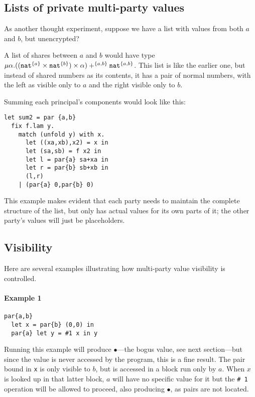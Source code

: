 \documentclass[10pt]{article}
\newcommand{\tnat}{\ensuremath{\mathtt{nat}}}
\newcommand{\tpair}[2]{\ensuremath{{#1} \times {#2}}}
\newcommand{\tsum}[3]{\ensuremath{{#1} +^{#3} {#2}}}
\newcommand{\trec}[2]{\ensuremath{\mu {#1}.{#2}}}
\newcommand{\vcrash}{\ensuremath{\bullet}}
\begin{document}
\subsection{Lists of private multi-party values}

As another thought experiment, suppose we have a list with values from
both $a$ and $b$, but unencrypted?

A list of shares between $a$ and $b$ would have type
$\trec{\alpha}{\tsum{(\tpair{(\tpair{\tnat^{\{a\}}}{\tnat^{\{b\}}})}{\alpha})}{\tnat^{\twoprins}}{\twoprins}}$.
This list is like the earlier one, but instead of shared numbers as
its contents, it has a pair of normal numbers, with the left as
visible only to $a$ and the right visible only to $b$.

Summing each principal's components would look like this:
\begin{verbatim}
let sum2 = par {a,b}
  fix f.lam y.
    match (unfold y) with x.
      let ((xa,xb),x2) = x in
      let (sa,sb) = f x2 in
      let l = par{a} sa+xa in
      let r = par{b} sb+xb in
      (l,r)
    | (par{a} 0,par{b} 0)
\end{verbatim}
This example makes evident that each party needs to maintain the
complete structure of the list, but only has actual values for its own
parts of it; the other party's values will just be placeholders.

\subsection{Visibility}

Here are several examples illustrating how multi-party value
visibility is controlled.

\paragraph{Example 1}
\begin{verbatim}
par{a,b}
  let x = par{b} (0,0) in
  par{a} let y = #1 x in y
\end{verbatim}
Running this example will produce $\vcrash$---the bogus value, see
next section---but since the value is never accessed by the program,
this is a fine result. The pair bound in \texttt{x} is only visible to
$b$, but is accessed in a block run only by $a$. When $x$ is looked up
in that latter block, $a$ will have no specific value for it but the
\texttt{\# 1} operation will be allowed to proceed, also producing
$\vcrash$, as pairs are not located.
\end{document}

